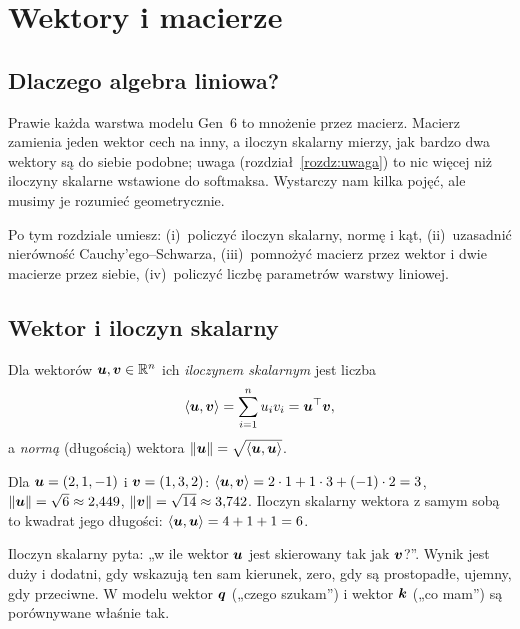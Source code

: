 \chapter{Wektory i macierze}\label{rozdz:wektory}

\section{Dlaczego algebra liniowa?}

Prawie każda warstwa modelu Gen~6 to mnożenie przez macierz. Macierz zamienia jeden wektor cech na inny,
a iloczyn skalarny mierzy, jak bardzo dwa wektory są do siebie podobne; uwaga (rozdział~\ref{rozdz:uwaga})
to nic więcej niż iloczyny skalarne wstawione do softmaksa. Wystarczy nam kilka pojęć, ale musimy je rozumieć
geometrycznie.

Po tym rozdziale umiesz: (i)~policzyć iloczyn skalarny, normę i kąt, (ii)~uzasadnić nierówność Cauchy'ego--Schwarza,
(iii)~pomnożyć macierz przez wektor i dwie macierze przez siebie, (iv)~policzyć liczbę parametrów warstwy liniowej.

\section{Wektor i iloczyn skalarny}

\begin{definicja}\label{def:iloczyn-skalarny}
Dla wektorów $\bm{u},\bm{v}\in\mathbb{R}^n$ ich \emph{iloczynem skalarnym} jest liczba
\begin{equation}
  \left\langle \bm{u},\bm{v}\right\rangle=\sum_{i=1}^{n}u_iv_i=\bm{u}^{\top}\bm{v} ,
\end{equation}
a \emph{normą} (długością) wektora $\left\lVert \bm{u}\right\rVert=\sqrt{\left\langle \bm{u},\bm{u}\right\rangle}$.
\end{definicja}

\begin{przyklad}\label{prz:iloczyn}
Dla $\bm{u}=(2,1,-1)$ i $\bm{v}=(1,3,2)$: $\left\langle \bm{u},\bm{v}\right\rangle=2\cdot1+1\cdot3+(-1)\cdot2=3$,
$\left\lVert \bm{u}\right\rVert=\sqrt6\approx2{,}449$, $\left\lVert \bm{v}\right\rVert=\sqrt{14}\approx3{,}742$. Iloczyn skalarny wektora z samym sobą
to kwadrat jego długości: $\left\langle \bm{u},\bm{u}\right\rangle=4+1+1=6$.
\end{przyklad}

\begin{intuicja}
Iloczyn skalarny pyta: „w ile wektor $\bm{u}$ jest skierowany tak jak $\bm{v}$?”. Wynik jest duży i dodatni,
gdy wskazują ten sam kierunek, zero, gdy są prostopadłe, ujemny, gdy przeciwne. W modelu wektor $\bm{q}$
(„czego szukam”) i wektor $\bm{k}$ („co mam”) są porównywane właśnie tak.
\end{intuicja}


